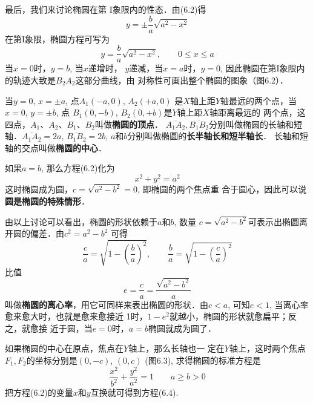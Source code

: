 最后，我们来讨论椭圆在第
I象限内的性态．由(6.2)得
\[y=\pm\frac{b}{a}\sqrt{a^2-x^2}\]
在第I象限，椭圆方程可写为
\[y=\frac{b}{a}\sqrt{a^2-x^2},\qquad 0\le x\le a\]
当$x=0$时，$y=b$, 当$x$递增时，
$y$递减，当$x=a$时，$y=0$, 
因此椭圆在第I象限内的轨迹大致是$B_2A_2$这部分曲线，由
对称性可画出整个椭圆的图象（图6.2）．

\begin{figure}[htp]
    \centering
    \caption{}
\end{figure}

当$y=0$, $x=\pm a$, 点$A_1(-a,0)$, $A_2(+a,0)$
是$X$轴上距$Y$轴最远的两个点，当$x=0$, $y=\pm b$, 点
$B_1(0,-b)$, $B_2(0,+b)$是$Y$轴上距$X$轴距离最远的
两个点，这四点，$A_1$、$A_2$、$B_1$、$B_2$叫做\textbf{椭圆的顶点}．
$\overline{A_1A_2},\overline{B_1B_2}$分别叫做椭圆的长轴和短轴．$\overline{A_1A_2}=2a$, 
$\overline{B_1B_2}=2b$, $a$和$b$分别叫做椭圆的\textbf{长半轴长和短半轴长}．
长轴和短轴的交点叫做\textbf{椭圆的中心}．

如果$a=b$, 那么方程(6.2)化为
\[x^2+y^2=a^2\]
这时椭圆成为圆，$c=\sqrt{a^2-b^2}=0$, 即椭圆的两个焦点重
合于圆心，因此可以说\textbf{圆是椭圆的特殊情形}．

由以上讨论可以看出，椭圆的形状依赖于$a$和$b$, 数量
$c=\sqrt{a^2-b^2}$可表示出椭圆离开圆的偏差．由$c^2=a^2-b^2$
可得
\[\frac{c}{a}=\sqrt{1-\left(\frac{b}{a}\right)^2},\qquad \frac{b}{a}=\sqrt{1-\left(\frac{c}{a}\right)^2}\]
比值
\[e=\frac{c}{a}=\frac{\sqrt{a^2-b^2}}{a}\]
叫做\textbf{椭圆的离心率}，用它可同样来表出椭圆的形状．由$c<
a$, 可知$e<1$, 当离心率愈来愈大时，也就是愈来愈接近
1时，$1-e^2$就越小，椭圆的形状就愈扁平；反之，就愈接
近于圆，当$e=0$时，$a=b$椭圆就成为圆了．

如果椭圆的中心在原点，焦点在$Y$轴上，那么长轴也一
定在$Y$轴上，这时两个焦点$F_1,F_2$的坐标分别是$(0,-c)$,
$(0,c)$ (图6.3), 求得椭圆的标准方程是
\begin{equation}
    \boxed{\frac{x^2}{b^2}+\frac{y^2}{a^2}=1}\qquad a\ge b>0
\end{equation}
把方程(6.2)的变量$x$和$y$互换就可得到方程(6.4).

